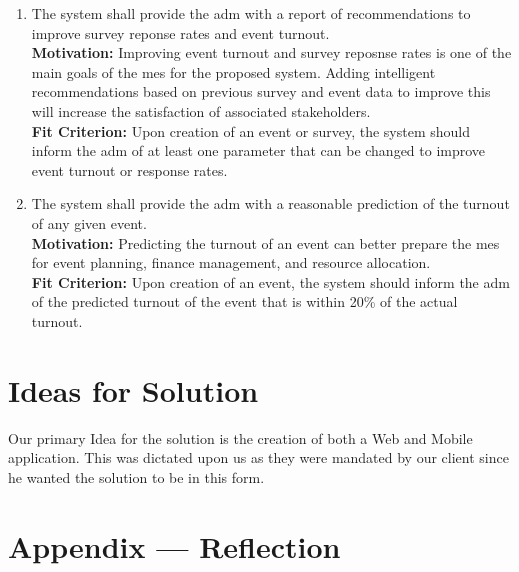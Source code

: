 \documentclass[12pt]{article}
\begin{document}
\begin{enumerate}[align=left,
  leftmargin=*,
  labelsep=1em,
  itemindent=0em,
  label=\bfseries WR-\arabic*:,
  ref=\bfseries WR-\arabic*]
  \item \label{WR4} The system shall provide the \gls{adm} with a report of recommendations to improve survey reponse rates and event turnout.\\[2mm]
  {\bf Motivation:} Improving event turnout and survey reposnse rates is one of the main goals of the \gls{mes} for the proposed system. Adding intelligent recommendations based on previous survey and event data to improve this will increase the satisfaction of associated stakeholders.\\
  {\bf Fit Criterion:} Upon creation of an event or survey, the system should inform the \gls{adm} of at least one parameter that can be changed to improve event turnout or response rates.

  \item \label{WR5} The system shall provide the \gls{adm} with a reasonable prediction of the turnout of any given event.\\[2mm]
  {\bf Motivation:} Predicting the turnout of an event can better prepare the \gls{mes} for event planning, finance management, and resource allocation.\\
  {\bf Fit Criterion:} Upon creation of an event, the system should inform the \gls{adm} of the predicted turnout of the event that is within 20\% of the actual turnout.
  
\end{enumerate}


\section{Ideas for Solution}
Our primary Idea for the solution is the creation of both a Web and Mobile application. This was dictated upon us as they were mandated by our client since he wanted the solution to be in this form. 


\newpage{}
\section*{Appendix --- Reflection}




\end{document}
